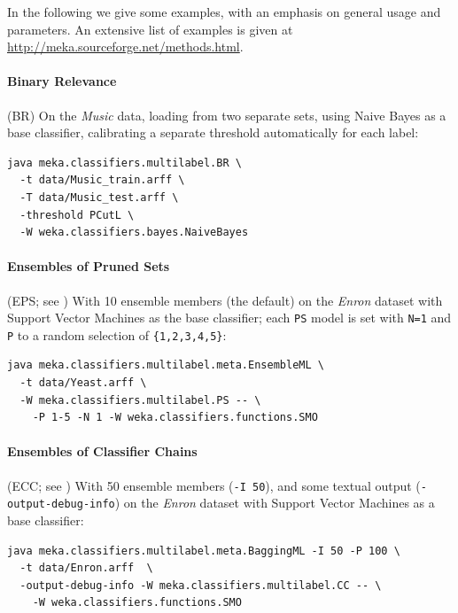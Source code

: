 \documentclass[11pt]{article}
\begin{document}
In the following we give some examples, with an emphasis on general usage and parameters. An extensive list of examples is given at \url{http://meka.sourceforge.net/methods.html}. 



\paragraph{Binary Relevance} (BR) On the \textit{Music} data, loading from two separate sets, using Naive Bayes as a base classifier, calibrating a separate threshold automatically for each label: 
\begin{lstlisting}
java meka.classifiers.multilabel.BR \
  -t data/Music_train.arff \
  -T data/Music_test.arff \
  -threshold PCutL \
  -W weka.classifiers.bayes.NaiveBayes
\end{lstlisting}

\paragraph{Ensembles of Pruned Sets} (EPS; see \cite{EPS}) With 10 ensemble members (the default) on the \textit{Enron} dataset with Support Vector Machines as the base classifier; each \texttt{PS} model is set with \texttt{N=1} and \texttt{P} to a random selection of \texttt{\{1,2,3,4,5\}}:

\begin{lstlisting}
java meka.classifiers.multilabel.meta.EnsembleML \
  -t data/Yeast.arff \
  -W meka.classifiers.multilabel.PS -- \
    -P 1-5 -N 1 -W weka.classifiers.functions.SMO
\end{lstlisting}

\paragraph{Ensembles of Classifier Chains} (ECC; see \cite{ECC2}) With 50 ensemble members (\texttt{-I 50}), and some textual output (\texttt{-output-debug-info}) on the \textit{Enron} dataset with Support Vector Machines as a base classifier:
\begin{lstlisting}
java meka.classifiers.multilabel.meta.BaggingML -I 50 -P 100 \
  -t data/Enron.arff  \
  -output-debug-info -W meka.classifiers.multilabel.CC -- \ 
    -W weka.classifiers.functions.SMO
\end{lstlisting}
\end{document}
